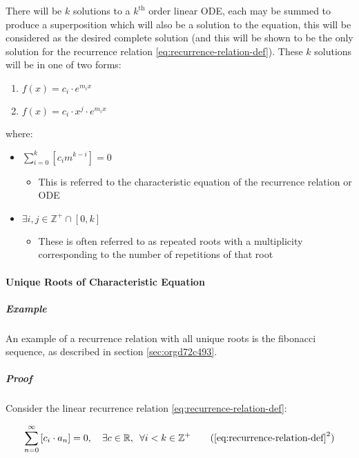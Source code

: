 \documentclass[11pt]{article}
\begin{document}
There will be \(k\) solutions to a \(k^{\mathrm{th}}\) order linear ODE, each may be summed to produce a superposition which will also be a solution to the equation, \cite[Ch. 4]{Zil2009}  this will be considered as the desired complete solution (and this will be shown to be the only solution for the recurrence relation \eqref{eq:recurrence-relation-def}). These \(k\) solutions will be in one of two forms:

\begin{enumerate}
\item \(f(x)=c_{i} \cdot e^{m_{i}x}\)
\item \(f(x)=c_{i} \cdot x^{j}\cdot e^{m_{i}x}\)
\end{enumerate}

where:

\begin{itemize}
\item \(\sum^{k}_{i=0}\left[  c_{i}m^{k-i} \right] = 0\)
\begin{itemize}
\item This is referred to the characteristic equation of the recurrence relation or ODE \cite{levinSolvingRecurrenceRelations2018}
\end{itemize}
\item \(\exists i,j \in \mathbb{Z}^{+} \cap \left[0,k\right]\)
\begin{itemize}
\item These is often referred to as repeated roots \cite{levinSolvingRecurrenceRelations2018,zillMatrixExponential2009} with a multiplicity corresponding to the number of repetitions of that root \cite[]{nicodemiIntroductionAbstractAlgebra2007}
\end{itemize}
\end{itemize}

\paragraph{Unique Roots of Characteristic Equation}
\label{sec:org516b254}
\subparagraph{Example}
\label{sec:org2c8a7a1}
An example of a recurrence relation with all unique roots is the fibonacci sequence, as described in section \ref{sec:orgd72c493}.
\subparagraph{Proof}
\label{sec:org50e07b8}
Consider the linear recurrence relation \eqref{eq:recurrence-relation-def}:

\begin{align}
\sum^{\infty}_{n= 0}   \left[ c_i \cdot  a_n \right] = 0, \quad \exists c \in
\mathbb{R}, \enspace \forall i<k\in\mathbb{Z}^+ \tag{$\textrm{\ref{eq:recurrence-relation-def}}^2$}
\end{align}
\end{document}

